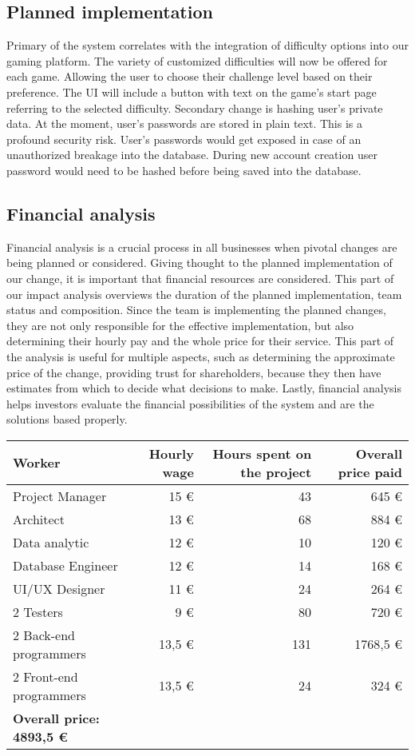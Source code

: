 \documentclass[11pt,a4paper]{article}
\begin{document}
\subsection{Planned implementation}
Primary of the system correlates with the integration of difficulty options into our gaming platform. The variety of customized difficulties will now be offered for each game. Allowing the user to choose their challenge level based on their preference. The UI will include a button with text on the game's start page referring to the selected difficulty. 
Secondary change is hashing user's private data. At the moment, user's passwords are stored in plain text. This is a profound security risk. User's passwords would get exposed in case of an unauthorized breakage into the database. During new account creation user password would need to be hashed before being saved into the database.


\subsection{Financial analysis}
Financial analysis is a crucial process in all businesses when pivotal changes are being planned or considered. Giving thought to the planned implementation of our change, it is important that financial resources are considered. This part of our impact analysis overviews the duration of the planned implementation, team status and composition. Since the team is implementing the planned changes, they are not only responsible for the effective implementation, but also determining their hourly pay and the whole price for their service. This part of the analysis is useful for multiple aspects, such as determining the approximate price of the change, providing trust for shareholders, because they then have estimates from which to decide what decisions to make. Lastly, financial analysis helps investors evaluate the financial possibilities of the system and are the solutions based properly.

\begin{table}[h!]
    \centering
    \begin{tabular}{lrrr}
        \toprule
        Worker & Hourly wage & Hours spent on the project & Overall price paid \\
        \midrule
        Project Manager & 15 € & 43 & 645 € \\
        Architect & 13 € & 68 & 884 € \\
        Data analytic & 12 € & 10 & 120 € \\
        Database Engineer & 12 € & 14 & 168 € \\
        UI/UX Designer & 11 € & 24 & 264 € \\
        2 Testers & 9 € & 80 & 720 € \\
        2 Back-end programmers & 13,5 € & 131 & 1768,5 € \\
        2 Front-end programmers & 13,5 € & 24 & 324 € \\
        \midrule
        \textbf{Overall price:} \textbf{4893,5 €} \\
        \bottomrule
    \end{tabular}
\end{table}
\end{document}
